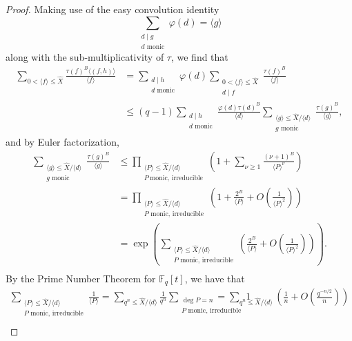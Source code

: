 \documentclass{article}
\theoremstyle{definition}
\theoremstyle{definition}
\theoremstyle{remark}
\newcommand{\F}{\mathbb{F}_q[t]}
\renewcommand\phi\varphi
\newcommand{\1}{\mathbf{1}}
\numberwithin{equation}{section}
\begin{document}
\begin{proof}
Making use of the easy convolution identity
\[\sum_{\substack{d\mid g\\d\text{~monic}}}\phi(d)=\langle g \rangle\]
along with the sub-multiplicativity of $\tau$, we find that
\begin{align*}
\sum_{0<\langle f \rangle \leq \widehat{X}}\frac{\tau(f)^B\langle (f,h) \rangle }{\langle f\rangle}&=\sum_{\substack{d\mid h\\d\text{~monic}}}\phi(d)\sum_{\substack{0<\langle f \rangle \leq \widehat{X}\\d\mid f}}\frac{\tau(f)^B}{\langle f\rangle}\\
&\le(q-1)\sum_{\substack{d\mid h\\d\text{~monic}}}\frac{\phi(d)\tau(d)^B}{\langle d \rangle}\sum_{\substack{\langle g \rangle \leq \widehat{X}/\langle d\rangle\\g\text{~monic}}}\frac{\tau(g)^B}{\langle g\rangle},
\end{align*}
and by Euler factorization,
\begin{align*}
\sum_{\substack{\langle g \rangle \leq \widehat{X}/\langle d\rangle\\g\text{~monic}}}\frac{\tau(g)^B}{\langle g\rangle}&\le\prod_{\substack{\langle P\rangle
\leq \widehat{X}\slash \langle d \rangle \\P~\text{monic, irreducible}}}\left(1+\sum_{\nu\ge1}\frac{(\nu+1)^B}{\langle P \rangle^{\nu}}\right)\\
&= \prod_{\substack{\langle P \rangle \leq \widehat{X}\slash \langle d \rangle \\P\text{~monic, irreducible}}}\left(1+\frac{2^B}{\langle P\rangle}+O\left(\frac{1}{\langle P\rangle^2}\right)\right)\\
&=\exp\left(\sum_{\substack{\langle P\rangle \leq \widehat{X}\slash \langle d \rangle \\P\text{~monic, irreducible}}}\left(\frac{2^B}{\langle P\rangle}+O\left(\frac{1}{\langle P\rangle^2}\right)\right)\right).\\
\end{align*}
By the Prime Number Theorem for $\F$, we have that 
\begin{align*}
\sum_{\substack{\langle P\rangle \leq \widehat{X}\slash \langle d \rangle\\P\text{~monic, irreducible}}}\frac{1}{\langle P\rangle}=\sum_{q^n\le\widehat{X}\slash \langle d \rangle}\frac{1}{q^n}\sum_{\substack{\deg P=n\\P\text{~monic, irreducible}}}1&=\sum_{q^n\le\widehat{X}\slash \langle d \rangle}\left(\frac{1}{n}+O\left(\frac{q^{-n/2}}{n}\right)\right)\\

\end{align*}
\end{proof}
\end{document}
